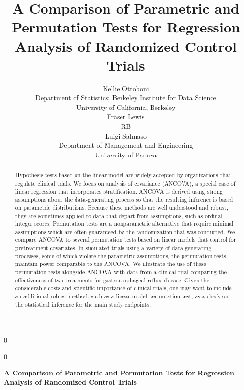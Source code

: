 \documentclass[12pt]{article}
\newcommand{\blind}{0}
\begin{document}
%

\def\spacingset#1{\renewcommand{\baselinestretch}%
{#1}\small\normalsize} \spacingset{1}



\blind
{
  \title{\bf A Comparison of Parametric and Permutation Tests for Regression Analysis of Randomized Control Trials}
\author{Kellie Ottoboni \\
Department of Statistics; Berkeley Institute for Data Science\\
University of California, Berkeley \\ 
Fraser Lewis \\
RB\\ 
Luigi Salmaso\\
Department of Management and Engineering \\
University of Padova
}  \maketitle
} \fi

\blind
{
  \bigskip
  \bigskip
  \bigskip
  \begin{center}
    {\LARGE\bf  A Comparison of Parametric and Permutation Tests for Regression Analysis of Randomized Control Trials}
\end{center}
  \medskip
} \fi

\bigskip
\begin{abstract}
Hypothesis tests based on the linear model are widely accepted by organizations that regulate clinical trials.
We focus on analysis of covariance (ANCOVA), a special case of linear regression that incorporates stratification.
ANCOVA is derived using strong assumptions about the data-generating process so that the resulting inference is based on parametric distributions.
Because these methods are well understood and robust, they are sometimes applied to data that depart from assumptions, such as ordinal integer scores.
Permutation tests are a nonparametric alternative that require minimal assumptions which are often guaranteed by the randomization that was conducted.
We compare ANCOVA to several permutation tests based on linear models that control for pretreatment covariates.
In simulated trials using a variety of data-generating processes, some of which violate the parametric assumptions,
the permutation tests maintain power comparable to the ANCOVA.
We illustrate the use of these permutation tests alongside ANCOVA with data from a clinical trial comparing the effectiveness of two treatments for gastroesophageal reflux disease.
Given the considerable costs and scientific importance of clinical trials, one may want to include an additional robust method, such as a linear model permutation test, as a check on the statistical inference for the main study endpoints.
\end{abstract}
\end{document}
